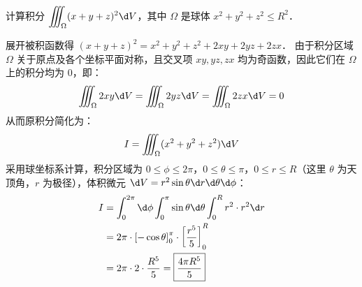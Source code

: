\documentclass[12pt, a4paper, oneside, UTF8]{ctexbook}
\begin{document}
\begin{exercise}
    计算积分 $\displaystyle\iiint_\Omega (x+y+z)^2 \d V$，其中 $\Omega$ 是球体 $x^2+y^2+z^2 \le R^2$．
\end{exercise}
\begin{solution}
展开被积函数得 $(x+y+z)^2 = x^2+y^2+z^2 + 2xy + 2yz + 2zx$．
由于积分区域 $\Omega$ 关于原点及各个坐标平面对称，且交叉项 $xy, yz, zx$ 均为奇函数，因此它们在 $\Omega$ 上的积分均为 0，即：
\[ \iiint_\Omega 2xy \d V = \iiint_\Omega 2yz \d V = \iiint_\Omega 2zx \d V = 0 \]
从而原积分简化为：
\[ I = \iiint_\Omega (x^2+y^2+z^2) \d V \]
采用球坐标系计算，积分区域为 $0 \le \phi \le 2\pi$，$0 \le \theta \le \pi$，$0 \le r \le R$（这里 $\theta$ 为天顶角，$r$ 为极径），体积微元 $\d V = r^2\sin\theta \d r\d\theta\d\phi$：
\begin{align*}
I &= \int_0^{2\pi} \d\phi \int_0^\pi \sin\theta \d\theta \int_0^R r^2 \cdot r^2 \d r \\
  &= 2\pi \cdot \left[ -\cos\theta \right]_0^\pi \cdot \left[ \frac{r^5}{5} \right]_0^R \\
  &= 2\pi \cdot 2 \cdot \frac{R^5}{5} = \boxed{\frac{4\pi R^5}{5}}
\end{align*}
\end{solution}
\end{document}
